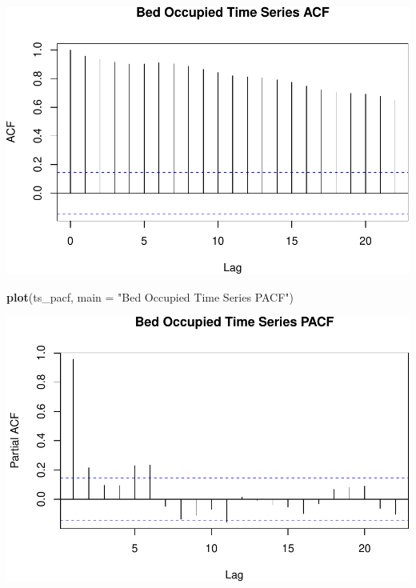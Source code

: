 \documentclass[
]{article}
\newenvironment{Shaded}{\begin{snugshade}}{\end{snugshade}}
\newcommand{\DataTypeTok}[1]{\textcolor[rgb]{0.13,0.29,0.53}{#1}}
\newcommand{\KeywordTok}[1]{\textcolor[rgb]{0.13,0.29,0.53}{\textbf{#1}}}
\newcommand{\NormalTok}[1]{#1}
\newcommand{\StringTok}[1]{\textcolor[rgb]{0.31,0.60,0.02}{#1}}
\begin{document}
\includegraphics{Real_files/figure-latex/acf-1.pdf}

\begin{Shaded}
\begin{Highlighting}[]
\KeywordTok{plot}\NormalTok{(ts_pacf, }\DataTypeTok{main =} \StringTok{"Bed Occupied Time Series PACF"}\NormalTok{)}
\end{Highlighting}
\end{Shaded}

\includegraphics{Real_files/figure-latex/acf-2.pdf}
\end{document}
